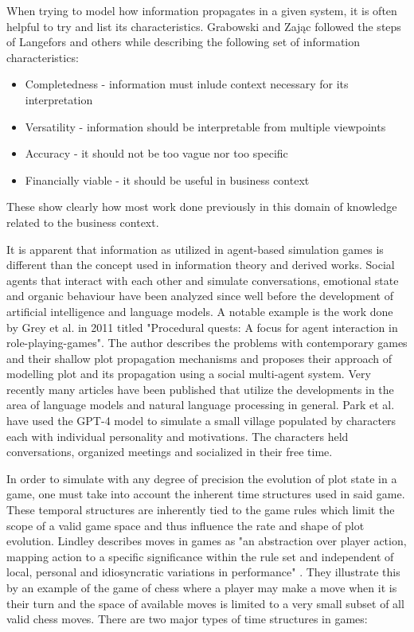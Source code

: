 When trying to model how information propagates in a given system, it is often helpful to try and list its characteristics.
Grabowski and Zając followed the steps of Langefors and others while describing the following set of information characteristics:
\begin{itemize}
    \item Completedness - information must inlude context necessary for its interpretation
    \item Versatility - information should be interpretable from multiple viewpoints
    \item Accuracy - it should not be too vague nor too specific
    \item Financially viable - it should be useful in business context
\end{itemize}
These show clearly how most work done previously in this domain of knowledge related to the business context.

It is apparent that information as utilized in agent-based simulation games is different than the concept used in information theory and derived works.
Social agents that interact with each other and simulate conversations, emotional state and organic behaviour have been analyzed since well before the development of artificial intelligence and language models.
A notable example is the work done by Grey et al. in 2011 titled "Procedural quests: A focus for agent interaction in role-playing-games"\cite{grey2011procedural}.
The author describes the problems with contemporary games and their shallow plot propagation mechanisms and proposes their approach of modelling plot and its propagation using a social multi-agent system.
Very recently many articles have been published that utilize the developments in the area of language models and natural language processing in general.
Park et al.\cite{park2023generative} have used the GPT-4 model\cite{openai2023gpt4} to simulate a small village populated by characters each with individual personality and motivations.
The characters held conversations, organized meetings and socialized in their free time.

In order to simulate with any degree of precision the evolution of plot state in a game, one must take into account the inherent time structures used in said game.
These temporal structures are inherently tied to the game rules which limit the scope of a valid game space and thus influence the rate and shape of plot evolution.
Lindley describes moves in games as "an abstraction over player action, mapping action to a specific significance within the rule set and independent of local, personal and idiosyncratic variations in performance" \cite{lindley2005story}.
They illustrate this by an example of the game of chess where a player may make a move when it is their turn and the space of available moves is limited to a very small subset of all valid chess moves.
There are two major types of time structures in games:

